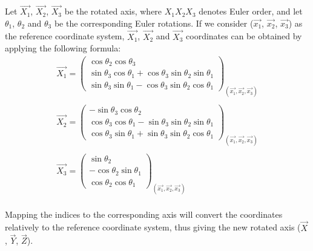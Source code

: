 Let $\overrightarrow{X_{1}}$, $\overrightarrow{X_{2}}$, $\overrightarrow{X_{3}}$ be the rotated axis, where $X_{1}X_{2}X_{3}$ denotes Euler order, and let $\theta_{1}$, $\theta_{2}$ and $\theta_{3}$ be the corresponding Euler rotations. If we consider ($\overrightarrow{x_{1}}$, $\overrightarrow{x_{2}}$, $\overrightarrow{x_{3}}$) as the reference coordinate system, $\overrightarrow{X_{1}}$, $\overrightarrow{X_{2}}$ and $\overrightarrow{X_{3}}$ coordinates can be obtained by applying the following formula:
\[
\begin{array}{lllll}
\overrightarrow{X_{1}} = \begin{pmatrix}
\cos{\theta_{2}}  \cos{\theta_{3}} \\
\sin{\theta_{3}}  \cos{\theta_{1}} + \cos{\theta_{3}}  \sin{\theta_{2}}  \sin{\theta_{1}}\\
\sin{\theta_{3}}  \sin{\theta_{1}} - \cos{\theta_{3}}  \sin{\theta_{2}}  \cos{\theta_{1}}
\end{pmatrix}_{(\overrightarrow{x_{1}}, \overrightarrow{x_{2}}, \overrightarrow{x_{3}})}\\ \\

\overrightarrow{X_{2}} = \begin{pmatrix}
-\sin{\theta_{3}}  \cos{\theta_{2}} \\
\cos{\theta_{3}}  \cos{\theta_{1}} - \sin{\theta_{3}}  \sin{\theta_{2}}  \sin{\theta_{1}}\\
\cos{\theta_{3}}  \sin{\theta_{1}} + \sin{\theta_{3}}  \sin{\theta_{2}}  \cos{\theta_{1}}
\end{pmatrix}_{(\overrightarrow{x_{1}}, \overrightarrow{x_{2}}, \overrightarrow{x_{3}})}\\ \\

\overrightarrow{X_{3}} = \begin{pmatrix}
\sin{\theta_{2}}\\
-\cos{\theta_{2}}  \sin{\theta_{1}}\\
\cos{\theta_{2}}  \cos{\theta_{1}}
\end{pmatrix}_{(\overrightarrow{x_{1}}, \overrightarrow{x_{2}}, \overrightarrow{x_{3}})}
\end{array}
\]\\
Mapping the indices to the corresponding axis will convert the coordinates relatively to the reference coordinate system, thus giving the new rotated axis ($\overrightarrow{X}$, $\overrightarrow{Y}$, $\overrightarrow{Z}$).\\

